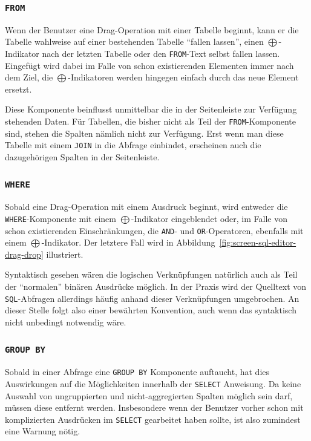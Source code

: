 \subsubsection{\texttt{FROM}}

Wenn der Benutzer eine Drag-Operation mit einer Tabelle beginnt, kann er die Tabelle wahlweise auf einer bestehenden Tabelle "`fallen lassen"', einen $\bigoplus$-Indikator nach der letzten Tabelle oder den \texttt{FROM}-Text selbst fallen lassen. Eingefügt wird dabei im Falle von schon existierenden Elementen immer nach dem Ziel, die $\bigoplus$-Indikatoren werden hingegen einfach durch das neue Element ersetzt.

Diese Komponente beinflusst unmittelbar die in der Seitenleiste zur Verfügung stehenden Daten. Für Tabellen, die bisher nicht als Teil der \texttt{FROM}-Komponente sind, stehen die Spalten nämlich nicht zur Verfügung. Erst wenn man diese Tabelle mit einem \texttt{JOIN} in die Abfrage einbindet, erscheinen auch die dazugehörigen Spalten in der Seitenleiste.

\subsubsection{\texttt{WHERE}}

Sobald eine Drag-Operation mit einem Ausdruck beginnt, wird entweder die \texttt{WHERE}-Komponente mit einem $\bigoplus$-Indikator eingeblendet oder, im Falle von schon existierenden Einschränkungen, die \texttt{AND}- und \texttt{OR}-Operatoren, ebenfalls mit einem $\bigoplus$-Indikator. Der letztere Fall wird in Abbildung~\ref{fig:screen-sql-editor-drag-drop} illustriert.

Syntaktisch gesehen wären die logischen Verknüpfungen natürlich auch als Teil der "`normalen"' binären Ausdrücke möglich. In der Praxis wird der Quelltext von \texttt{SQL}-Abfragen allerdings häufig anhand dieser Verknüpfungen umgebrochen. An dieser Stelle folgt \idename{} also einer bewährten Konvention, auch wenn das syntaktisch nicht unbedingt notwendig wäre.

\subsubsection{\texttt{GROUP BY}}

Sobald in einer Abfrage eine \texttt{GROUP BY} Komponente auftaucht, hat dies Auswirkungen auf die Möglichkeiten innerhalb der \texttt{SELECT} Anweisung. Da keine Auswahl von ungruppierten und nicht-aggregierten Spalten möglich sein darf, müssen diese entfernt werden. Insbesondere wenn der Benutzer vorher schon mit komplizierten Ausdrücken im \texttt{SELECT} gearbeitet haben sollte, ist also zumindest eine Warnung nötig.

